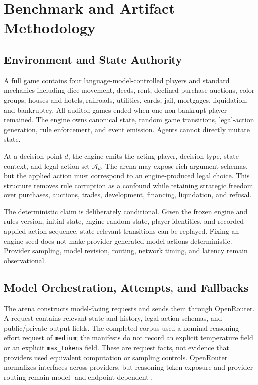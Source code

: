 \documentclass[conference]{IEEEtran}
\newcommand{\code}[1]{\texttt{#1}}
\begin{document}
\section{Benchmark and Artifact Methodology}
\label{sec:method}

\subsection{Environment and State Authority}

A full game contains four language-model-controlled players and standard mechanics including dice movement, deeds, rent, declined-purchase auctions, color groups, houses and hotels, railroads, utilities, cards, jail, mortgages, liquidation, and bankruptcy. All audited games ended when one non-bankrupt player remained. The engine owns canonical state, random game transitions, legal-action generation, rule enforcement, and event emission. Agents cannot directly mutate state.

At a decision point $d$, the engine emits the acting player, decision type, state context, and legal action set $\mathcal{A}_d$. The arena may expose rich argument schemas, but the applied action must correspond to an engine-produced legal choice. This structure removes rule corruption as a confound while retaining strategic freedom over purchases, auctions, trades, development, financing, liquidation, and refusal.

The deterministic claim is deliberately conditional. Given the frozen engine and rules version, initial state, engine random state, player identities, and recorded applied action sequence, state-relevant transitions can be replayed. Fixing an engine seed does not make provider-generated model actions deterministic. Provider sampling, model revision, routing, network timing, and latency remain observational.

\subsection{Model Orchestration, Attempts, and Fallbacks}

The arena constructs model-facing requests and sends them through OpenRouter. A request contains relevant state and history, legal-action schemas, and public/private output fields. The completed corpus used a nominal reasoning-effort request of \code{medium}; the manifests do not record an explicit temperature field or an explicit \code{max\_tokens} field. These are request facts, not evidence that providers used equivalent computation or sampling controls. OpenRouter normalizes interfaces across providers, but reasoning-token exposure and provider routing remain model- and endpoint-dependent \cite{openrouter_reasoning,openrouter_parameters,openrouter_routing}.
\end{document}
